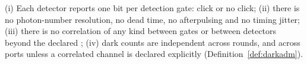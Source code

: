 
\begin{assumption}\label{ass:thresh}
(i) Each detector reports one bit per detection gate: click or no click;
(ii) there is no photon-number resolution, no dead time, no afterpulsing and
no timing jitter;
(iii) there is no correlation of any kind between gates or between detectors
beyond the declared ;
(iv) dark counts are independent across rounds, and across ports unless a
correlated channel is declared explicitly (Definition~\ref{def:darkadm}).
\end{assumption}
